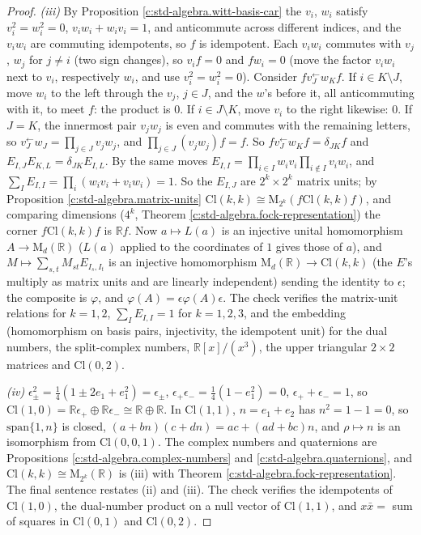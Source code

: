 \documentclass[11pt]{article}
\theoremstyle{definition}
\theoremstyle{plain}
\providecommand{\Cl}{}\renewcommand{\Cl}{\mathrm{Cl}}
\providecommand{\Mat}{}\renewcommand{\Mat}{\mathrm{M}}
\providecommand{\R}{}\renewcommand{\R}{\mathbb{R}}
\begin{document}
\begin{proof}
\emph{(iii)} By Proposition \ref{c:std-algebra.witt-basis-car} the $v_{i}$, $w_{i}$ satisfy $v_{i}^{2} = w_{i}^{2} = 0$, $v_{i}w_{i} + w_{i}v_{i} = 1$, and anticommute across different indices, and the $v_{i}w_{i}$ are commuting idempotents, so $f$ is idempotent. Each $v_{i}w_{i}$ commutes with $v_{j}$, $w_{j}$ for $j \ne i$ (two sign changes), so $v_{i}f = 0$ and $fw_{i} = 0$ (move the factor $v_{i}w_{i}$ next to $v_{i}$, respectively $w_{i}$, and use $v_{i}^{2} = w_{i}^{2} = 0$). Consider $fv_{J}^{\leftarrow}w_{K}f$. If $i \in K \setminus J$, move $w_{i}$ to the left through the $v_{j}$, $j \in J$, and the $w$'s before it, all anticommuting with it, to meet $f$: the product is $0$. If $i \in J \setminus K$, move $v_{i}$ to the right likewise: $0$. If $J = K$, the innermost pair $v_{j}w_{j}$ is even and commutes with the remaining letters, so $v_{J}^{\leftarrow}w_{J} = \prod_{j \in J}v_{j}w_{j}$, and $\prod_{j \in J}(v_{j}w_{j})f = f$. So $fv_{J}^{\leftarrow}w_{K}f = \delta_{JK}f$ and $E_{I,J}E_{K,L} = \delta_{JK}E_{I,L}$. By the same moves $E_{I,I} = \prod_{i \in I}w_{i}v_{i}\prod_{i \notin I}v_{i}w_{i}$, and $\sum_{I}E_{I,I} = \prod_{i}(w_{i}v_{i} + v_{i}w_{i}) = 1$. So the $E_{I,J}$ are $2^{k} \times 2^{k}$ matrix units; by Proposition \ref{c:std-algebra.matrix-units} $\Cl(k,k) \cong \Mat_{2^{k}}(f\Cl(k,k)f)$, and comparing dimensions ($4^{k}$, Theorem \ref{c:std-algebra.fock-representation}) the corner $f\Cl(k,k)f$ is $\R f$. Now $a \mapsto L(a)$ is an injective unital homomorphism $A \to \Mat_{d}(\R)$ ($L(a)$ applied to the coordinates of $1$ gives those of $a$), and $M \mapsto \sum_{s,t}M_{st}E_{I_{s},I_{t}}$ is an injective homomorphism $\Mat_{d}(\R) \to \Cl(k,k)$ (the $E$'s multiply as matrix units and are linearly independent) sending the identity to $\epsilon$; the composite is $\varphi$, and $\varphi(A) = \epsilon\varphi(A)\epsilon$. The check verifies the matrix-unit relations for $k = 1, 2$, $\sum_{I}E_{I,I} = 1$ for $k = 1, 2, 3$, and the embedding (homomorphism on basis pairs, injectivity, the idempotent unit) for the dual numbers, the split-complex numbers, $\R[x]/(x^{3})$, the upper triangular $2 \times 2$ matrices and $\Cl(0,2)$.

\emph{(iv)} $\epsilon_{\pm}^{2} = \tfrac14(1 \pm 2e_{1} + e_{1}^{2}) = \epsilon_{\pm}$, $\epsilon_{+}\epsilon_{-} = \tfrac14(1 - e_{1}^{2}) = 0$, $\epsilon_{+} + \epsilon_{-} = 1$, so $\Cl(1,0) = \R\epsilon_{+} \oplus \R\epsilon_{-} \cong \R \oplus \R$. In $\Cl(1,1)$, $n = e_{1} + e_{2}$ has $n^{2} = 1 - 1 = 0$, so $\mathrm{span}\{1, n\}$ is closed, $(a + bn)(c + dn) = ac + (ad + bc)n$, and $\rho \mapsto n$ is an isomorphism from $\Cl(0,0,1)$. The complex numbers and quaternions are Propositions \ref{c:std-algebra.complex-numbers} and \ref{c:std-algebra.quaternions}, and $\Cl(k,k) \cong \Mat_{2^{k}}(\R)$ is (iii) with Theorem \ref{c:std-algebra.fock-representation}. The final sentence restates (ii) and (iii). The check verifies the idempotents of $\Cl(1,0)$, the dual-number product on a null vector of $\Cl(1,1)$, and $x\bar{x} = $ sum of squares in $\Cl(0,1)$ and $\Cl(0,2)$.

\end{proof}
\end{document}
